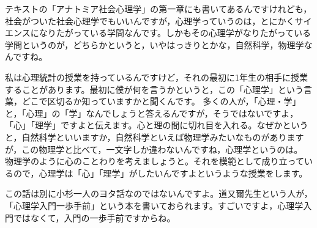 \documentclass{ltjsbook}
\begin{document}
テキストの「アナトミア社会心理学」の第一章にも書いてあるんですけれども，社会がついた社会心理学でもいいんですが，心理学っていうのは，とにかくサイエンスになりたがっている学問なんです。しかもその心理学がなりたがっている学問というのが，どちらかというと，いやはっきりとかな，自然科学，物理学なんですね。

私は心理統計の授業を持っているんですけど，それの最初に1年生の相手に授業することがあります。最初に僕が何を言うかというと，この「心理学」という言葉，どこで区切るか知っていますかと聞くんです。
多くの人が，「心理・学」と，「心理」の「学」なんでしょうと答えるんですが，そうではないですよ，「心」「理学」ですよと伝えます。心と理の間に切れ目を入れる。なぜかというと，自然科学といいますか，自然科学といえば物理学みたいなものがありますが，この物理学と比べて，一文字しか違わないんですね，心理学というのは。
物理学のように心のことわりを考えましょうと。それを模範として成り立っているので，心理学は「心」「理学」がしたいんですよというような授業をします。

この話は別に小杉一人のヨタ話なのではないんですよ。道又爾先生という人が，「心理学入門一歩手前」という本を書いておられます\parencite{Michimata200903}。すごいですよ，心理学入門ではなくて，入門の一歩手前ですからね。
\end{document}
